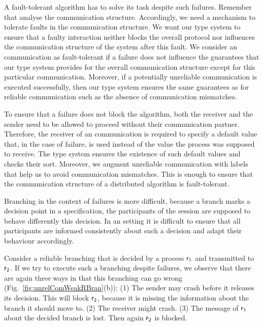 A fault-tolerant algorithm has to solve its task despite such failures.
Remember that \MPST analyse the communication structure.
Accordingly, we need a mechanism to tolerate faults in the communication structure.
We want our type system to ensure that a faulty interaction neither blocks the overall protocol nor influences the communication structure of the system after this fault.
We consider an \unrel communication as fault-tolerant if a failure does not influence the guarantees that our type system provides for the overall communication structure except for this particular communication.
Moreover, if a potentially unreliable communication is executed successfully, then our type system ensures the same guarantees as for reliable communication such as \eg the absence of communication mismatches.

To ensure that a failure does not block the algorithm, both the receiver and the sender need to be allowed to proceed without their \unrel communication partner. Therefore, the receiver of an \unrel communication is required to specify a default value that, in the case of failure, is used instead of the value the process was supposed to receive.
The type system ensures the existence of such default values and checks their sort.
Moreover, we augment unreliable communication with labels that help us to avoid communication mismatches.
This is enough to ensure that the communication structure of a distributed algorithm is fault-tolerant.

Branching in the context of failures is more difficult, because a branch marks a decision point in a specification, \ie the participants of the session are supposed to behave differently \wrt this decision.
In an \unrel setting it is difficult to ensure that all participants are informed consistently about such a decision and adapt their behaviour accordingly.

Consider a reliable branching that is decided by a process $ \mathsf{r}_1 $ and transmitted to $ \mathsf{r}_2 $.
If we try to execute such a branching despite failures, we observe that there are again three ways in that this branching can go wrong (Fig.~\ref{fig:unrelComWeakRBran}(b)):
(1) The sender may crash before it releases its decision.
This will block $ \mathsf{r}_2 $, because it is missing the information about the branch it should move to.
(2) The receiver might crash.
(3) The message of $ \mathsf{r}_1 $ about the decided branch is lost.
Then again $ \mathsf{r}_2 $ is blocked.

